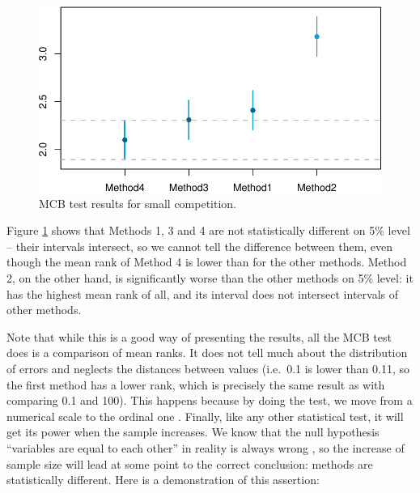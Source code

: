 \documentclass[
]{book}
\theoremstyle{definition}
\theoremstyle{definition}
\theoremstyle{definition}
\theoremstyle{definition}
\theoremstyle{remark}
\begin{document}
\begin{figure}
\centering
\includegraphics{Svetunkov--2022----ADAM_files/figure-latex/mcbForCompetition-1.pdf}
\caption{\label{fig:mcbForCompetition}MCB test results for small competition.}
\end{figure}

Figure \ref{fig:mcbForCompetition} shows that Methods 1, 3 and 4 are not statistically different on 5\% level -- their intervals intersect, so we cannot tell the difference between them, even though the mean rank of Method 4 is lower than for the other methods. Method 2, on the other hand, is significantly worse than the other methods on 5\% level: it has the highest mean rank of all, and its interval does not intersect intervals of other methods.

Note that while this is a good way of presenting the results, all the MCB test does is a comparison of mean ranks. It does not tell much about the distribution of errors and neglects the distances between values (i.e.~0.1 is lower than 0.11, so the first method has a lower rank, which is precisely the same result as with comparing 0.1 and 100). This happens because by doing the test, we move from a numerical scale to the ordinal one \citep[see Section 1.2 of][]{SvetunkovSBA}. Finally, like any other statistical test, it will get its power when the sample increases. We know that the null hypothesis ``variables are equal to each other'' in reality is always wrong \citep[see Section 5.3 of][]{SvetunkovSBA}, so the increase of sample size will lead at some point to the correct conclusion: methods are statistically different. Here is a demonstration of this assertion:
\end{document}

